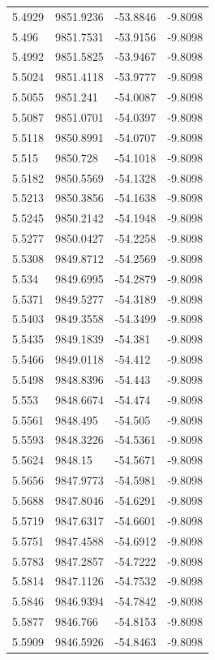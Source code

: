 \begin{table}[H]
\begin{tabular}{llll}
5.4929 & 9851.9236 & -53.8846 & -9.8098 \\
5.496 & 9851.7531 & -53.9156 & -9.8098 \\
5.4992 & 9851.5825 & -53.9467 & -9.8098 \\
5.5024 & 9851.4118 & -53.9777 & -9.8098 \\
5.5055 & 9851.241 & -54.0087 & -9.8098 \\
5.5087 & 9851.0701 & -54.0397 & -9.8098 \\
5.5118 & 9850.8991 & -54.0707 & -9.8098 \\
5.515 & 9850.728 & -54.1018 & -9.8098 \\
5.5182 & 9850.5569 & -54.1328 & -9.8098 \\
5.5213 & 9850.3856 & -54.1638 & -9.8098 \\
5.5245 & 9850.2142 & -54.1948 & -9.8098 \\
5.5277 & 9850.0427 & -54.2258 & -9.8098 \\
5.5308 & 9849.8712 & -54.2569 & -9.8098 \\
5.534 & 9849.6995 & -54.2879 & -9.8098 \\
5.5371 & 9849.5277 & -54.3189 & -9.8098 \\
5.5403 & 9849.3558 & -54.3499 & -9.8098 \\
5.5435 & 9849.1839 & -54.381 & -9.8098 \\
5.5466 & 9849.0118 & -54.412 & -9.8098 \\
5.5498 & 9848.8396 & -54.443 & -9.8098 \\
5.553 & 9848.6674 & -54.474 & -9.8098 \\
5.5561 & 9848.495 & -54.505 & -9.8098 \\
5.5593 & 9848.3226 & -54.5361 & -9.8098 \\
5.5624 & 9848.15 & -54.5671 & -9.8098 \\
5.5656 & 9847.9773 & -54.5981 & -9.8098 \\
5.5688 & 9847.8046 & -54.6291 & -9.8098 \\
5.5719 & 9847.6317 & -54.6601 & -9.8098 \\
5.5751 & 9847.4588 & -54.6912 & -9.8098 \\
5.5783 & 9847.2857 & -54.7222 & -9.8098 \\
5.5814 & 9847.1126 & -54.7532 & -9.8098 \\
5.5846 & 9846.9394 & -54.7842 & -9.8098 \\
5.5877 & 9846.766 & -54.8153 & -9.8098 \\
5.5909 & 9846.5926 & -54.8463 & -9.8098 \\

\end{tabular}
\end{table}
